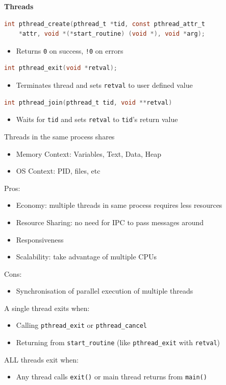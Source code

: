 \documentclass[a4paper, 12pt]{article}
\begin{document}
\begin{multicols*}{3}
\medskip

{\small\textbf{Threads}}
\begin{lstlisting}[language=C]
int pthread_create(pthread_t *tid, const pthread_attr_t 
    *attr, void *(*start_routine) (void *), void *arg);
\end{lstlisting}
\begin{itemize}
    \item Returns \texttt{0} on success, \texttt{!0} on errors
\end{itemize}
\begin{lstlisting}[language=C]
int pthread_exit(void *retval);
\end{lstlisting}
\begin{itemize}
    \item Terminates thread and sets \texttt{retval} to user defined value 
\end{itemize}
\begin{lstlisting}[language=C]
int pthread_join(pthread_t tid, void **retval)
\end{lstlisting}
\begin{itemize}
    \item Waits for \texttt{tid} and sets \texttt{retval} to \texttt{tid}'s return value
\end{itemize}
Threads in the same process shares
\begin{itemize}
	\item Memory Context: Variables, Text, Data, Heap
	\item OS Context: PID, files, etc
\end{itemize}
Pros:
\begin{itemize}
	\item Economy: multiple threads in same process requires less resources
	\item Resource Sharing: no need for IPC to pass messages around
	\item Responsiveness
	\item Scalability: take advantage of multiple CPUs
\end{itemize}
Cons:
\begin{itemize}
	\item Synchronisation of parallel execution of multiple threads
\end{itemize}
A single thread exits when:
\begin{itemize}
	\item Calling \texttt{pthread\_exit} or \texttt{pthread\_cancel}
	\item Returning from \texttt{start\_routine} (like \texttt{pthread\_exit} with \texttt{retval})
\end{itemize}
ALL threads exit when:
\begin{itemize}
	\item Any thread calls \texttt{exit()} or main thread returns from \texttt{main()}
\end{itemize}


\end{multicols*}
\end{document}
